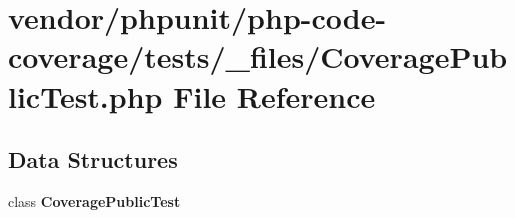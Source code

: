 \section{vendor/phpunit/php-\/code-\/coverage/tests/\+\_\+files/\+Coverage\+Public\+Test.php File Reference}
\label{php-code-coverage_2tests_2__files_2_coverage_public_test_8php}
\subsection*{Data Structures}
\begin{DoxyCompactItemize}
\item 
class {\bf Coverage\+Public\+Test}
\end{DoxyCompactItemize}

